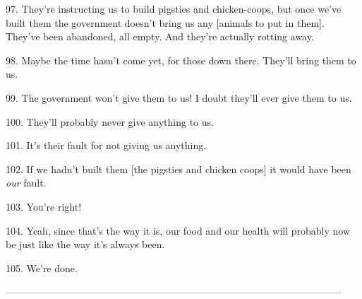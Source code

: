 97. They're instructing us to build pigsties and chicken-coops, but once we've
built them the government doesn't bring us any [animals to put in them]. They've
been abandoned, all empty. And they're actually rotting away.

98. Maybe the time hasn't come yet, for those down there. They'll bring them to
us.

99. The government won't give them to us! I doubt they'll ever give them to us.

100. They'll probably never give anything to us.

101. It's their fault for not giving us anything.

102. If we hadn't built them [the pigsties and chicken coops] it would have been
\textit{our} fault.

103. You're right!

104. Yeah, since that's the way it is, our food and our health will probably now
be just like the way it's always been.

105. We're done.

------------------------------------------------------------------------------------------------------

